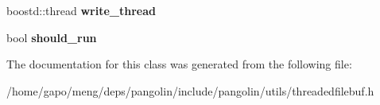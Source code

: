 \begin{DoxyCompactItemize}
\item 
boostd\+::thread {\bfseries write\+\_\+thread}\hypertarget{classpangolin_1_1threadedfilebuf_a59913f59bafc9ed2aaa27f02ec23fe73}{}\label{classpangolin_1_1threadedfilebuf_a59913f59bafc9ed2aaa27f02ec23fe73}

\item 
bool {\bfseries should\+\_\+run}\hypertarget{classpangolin_1_1threadedfilebuf_aa9f98f7b857d6ef1b5cdd0fe9061eb95}{}\label{classpangolin_1_1threadedfilebuf_aa9f98f7b857d6ef1b5cdd0fe9061eb95}

\end{DoxyCompactItemize}


The documentation for this class was generated from the following file\+:\begin{DoxyCompactItemize}
\item 
/home/gapo/meng/deps/pangolin/include/pangolin/utils/threadedfilebuf.\+h\end{DoxyCompactItemize}
